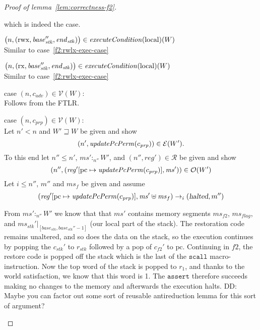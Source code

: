\documentclass[a4paper]{article}
\newcommand{\update}[2]{[#1 \mapsto #2]}
\newcommand\dominique[1]{{\color{purple} \sf \footnotesize {DD: #1}}\\}
\newcommand{\var}[1]{\mathit{#1}}
\newcommand{\hs}{\var{ms}}
\newcommand{\ms}{\hs}
\newcommand{\pcreg}{\mathrm{pc}}
\newcommand{\start}{\var{base}}
\newcommand{\addrend}{\var{end}}
\newcommand{\reg}{\var{reg}}
\newcommand{\heap}{\var{mem}}
\newcommand{\adv}{\var{adv}}
\newcommand{\stk}{\var{stk}}
\newcommand{\flag}{\var{flag}}
\newcommand{\halted}{\textsl{halted}}
\newcommand{\plainfun}[2]{
  \ifthenelse{\equal{#2}{}}
  {\mathit{#1}}
  {\mathit{#1}(#2)}
}
\newcommand{\updatePcPerm}[1]{\plainfun{updatePcPerm}{#1}}
\newcommand{\execCond}[1]{\plainfun{executeCondition}{#1}}
\newcommand{\future}{\mathbin{\sqsupseteq}}
\newcommand{\heapSat}[3][\heap]{#1 :_{#2} #3}
\newcommand{\asmType}{\plaindom{AsmType}}
\newcommand{\plaindom}[1]{\mathrm{#1}}
\newcommand{\intr}[2]{\mathcal{#1}}
\newcommand{\valueintr}[1]{\intr{V}{#1}}
\newcommand{\exprintr}[1]{\intr{E}{#1}}
\newcommand{\regintr}[1]{\intr{R}{#1}}
\newcommand{\stdvr}{\valueintr{\asmType}}
\newcommand{\stder}{\exprintr{\asmType}}
\newcommand{\stdrr}{\regintr{\asmType}}
\newcommand{\observations}{\mathcal{O}}
\newcommand{\npair}[2][n]{\left(#1,#2 \right)}
\newcommand{\plainperm}[1]{\mathrm{#1}}
\newcommand{\exec}{\plainperm{rx}}
\newcommand{\rwx}{\plainperm{rwx}}
\newcommand{\local}{\plainperm{local}}
\newcommand{\step}[1][]{\rightarrow_{#1}}
\begin{document}
\begin{proof}[Proof of lemma~\ref{lem:correctness-f2}]
\begin{enumproof}[resume]
\begin{enumproof}
\begin{enumproof}
\begin{enumproof}
\[          \]
          which is indeed the case.
        \end{enumproof}
      \item $\npair{(\rwx,\start_\stk'', \addrend_\stk)} \in \execCond{}(\local)(W)$\\
        Similar to case~\ref{f2:rwlx-exec-case}
      \item $\npair{(\exec,\start_\stk'', \addrend_\stk)} \in \execCond{}(\local)(W)$\\
        Similar to case~\ref{f2:rwlx-exec-case}
      \end{enumproof}
    \item case $\npair{c_\adv} \in \stdvr(W)$:\\
      Follows from the FTLR.
    \item case $\npair{c_{\var{prp}}} \in \stdvr(W)$: \label{f2:c-prp}\\
      Let $n' < n$ and $W' \future W$ be given and show
      \[
        \npair[n']{\updatePcPerm{c_{\var{prp}}}} \in \stder(W').
      \]
      To this end let $n'' \leq n'$, $\heapSat[\ms']{n''}{W'}$, and $\npair[n'']{\reg'} \in \stdrr$ be given and show
      \[
        \npair[n'']{(\reg'\update{\pcreg}{\updatePcPerm{c_{\var{prp}}}},\ms')} \in \observations(W')
      \]
      Let $i \leq n''$, $m''$ and $\ms_f$ be given and assume
      \[
        (\reg'\update{\pcreg}{\updatePcPerm{c_{\var{prp}}}},\ms'\uplus\ms_f) \step[i]
        (\halted,m'')
      \]

      From $\heapSat[\ms']{n''}{W'}$ we know that that $\ms'$ contains memory segments $\hs_{f2}$, $\hs_\flag$, and $\ms_\stk'|_{[\start_\stk, \start_\stk''-1]}$ (our local part of the stack). The restoration code remains unaltered, and so does the data on the stack, so the execution continues by popping the $c_\stk'$ to $r_\stk$ followed by a pop of $c_{f2}'$ to $\pcreg$. Continuing in $f2$, the restore code is popped off the stack which is the last of the $\mathtt{scall}$ macro-instruction. Now the top word of the stack is popped to $r_1$, and thanks to the world satisfaction, we know that this word is 1. The $\mathtt{assert}$ therefore succeeds making no changes to the memory and afterwards the execution halts.
      \dominique{Maybe you can factor out some sort of reusable antireduction lemma
        for this sort of argument?}


\end{enumproof}
\end{enumproof}
\end{proof}
\end{document}
